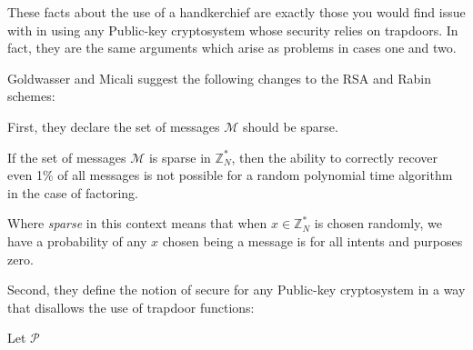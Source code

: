 These facts about the use of a handkerchief are exactly those you would find issue with in using any Public-key cryptosystem whose security relies on trapdoors. In fact, they are the same arguments which arise as problems in cases one and two. 

Goldwasser and Micali suggest the following changes to the RSA and Rabin schemes:


First, they declare the set of messages $\mathcal{M}$ should be sparse.

\begin{cla}
    If the set of messages $\mathcal{M}$ is sparse in $\mathbb{Z}_{N}^{*}$, then the ability to correctly recover even 1\% of all messages is not possible for a random polynomial time algorithm in the case of factoring.
\end{cla}

Where \emph{sparse} in this context means that when $x \in \mathbb{Z}_{N}^{*}$ is chosen randomly, we have a probability of any $x$ chosen being a message is for all intents and purposes zero. 


Second, they define the notion of secure for any Public-key cryptosystem in a way that disallows the use of trapdoor functions:

\begin{defn}
    Let $\mathcal{P}$ 
\end{defn}
